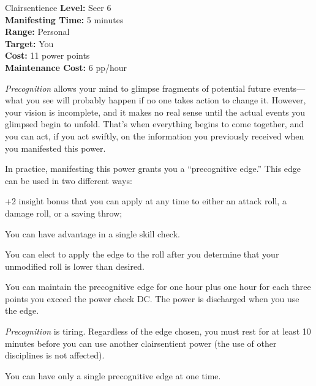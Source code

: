 {Clairsentience}
{
	\textbf{Level:}
	Seer 6\\
	\textbf{Manifesting Time:}
	5 minutes\\
	\textbf{Range:}
	Personal\\
	\textbf{Target:}
	You\\
	\textbf{Cost:}
	11 power points\\
	\textbf{Maintenance Cost:}
	6 pp/hour\\
}
{
	\emph{Precognition} allows your mind to glimpse fragments of potential future events---what you see will probably happen if no one takes action to change it. However, your vision is incomplete, and it makes no real sense until the actual events you glimpsed begin to unfold. That's when everything begins to come together, and you can act, if you act swiftly, on the information you previously received when you manifested this power.

	In practice, manifesting this power grants you a ``precognitive edge.'' This edge can be used in two different ways:
	\begin{enumerate*}
	\item +2 insight bonus that you can apply at any time to either an attack roll, a damage roll, or a saving throw;
	\item You can have advantage in a single skill check.
	\end{enumerate*}

	You can elect to apply the edge to the roll after you determine that your unmodified roll is lower than desired.

	You can maintain the precognitive edge for one hour plus one hour for each three points you exceed the power check DC. The power is discharged when you use the edge.

	\emph{Precognition} is tiring. Regardless of the edge chosen, you must rest for at least 10 minutes before you can use another clairsentient power (the use of other disciplines is not affected).

	You can have only a single precognitive edge at one time.
}